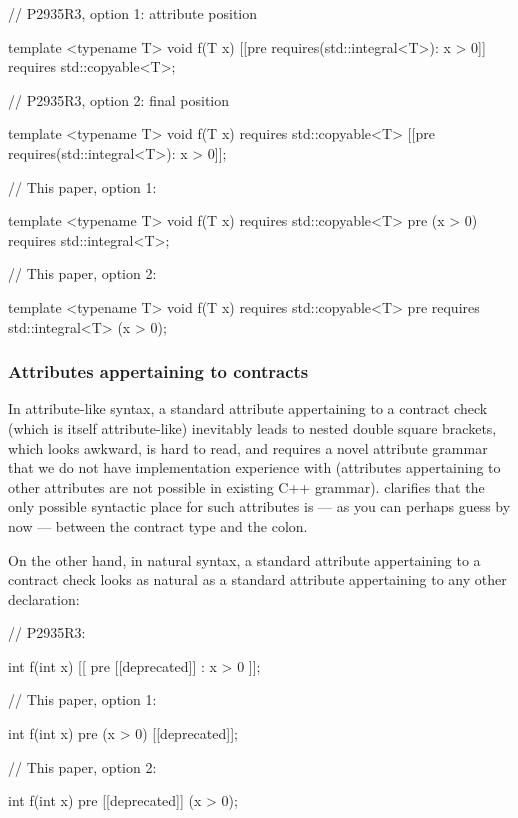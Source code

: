 \begin{minipage}[t]{8.7cm}
\begin{codeblock}
// P2935R3, option 1: attribute position

template <typename T>
void f(T x)
  [[pre requires(std::integral<T>): x > 0]]
  requires std::copyable<T>;
    
// P2935R3, option 2: final position

template <typename T>
void f(T x)
  requires std::copyable<T>
  [[pre requires(std::integral<T>): x > 0]];
\end{codeblock}
\end{minipage}
\begin{minipage}[t]{8cm}
\begin{codeblock}
// This paper, option 1:

template <typename T>
void f(T x)
  requires std::copyable<T>
  pre (x > 0) requires std::integral<T>;
    
// This paper, option 2:

template <typename T>
void f(T x)
  requires std::copyable<T>
  pre requires std::integral<T> (x > 0);
\end{codeblock}
\end{minipage}

\subsubsection{Attributes appertaining to contracts}

In attribute-like syntax, a standard attribute appertaining to a contract check (which is itself attribute-like) inevitably leads to nested double square brackets, which looks awkward, is hard to read, and requires a novel attribute grammar that we do not have implementation experience with (attributes appertaining to other attributes are not possible in existing C++ grammar).  \cite{P2935R3} clarifies that the only possible syntactic place for such attributes is --- as you can perhaps guess by now --- between the contract type and the colon.

On the other hand, in natural syntax, a standard attribute appertaining to a contract check looks as natural as a standard attribute appertaining to any other declaration:

\begin{minipage}[t]{8cm}
\begin{codeblock}
// P2935R3:

int f(int x) 
  [[ pre [[deprecated]] : x > 0 ]];
\end{codeblock}
\end{minipage}
\begin{minipage}[t]{8cm}
\begin{codeblock}
// This paper, option 1:

int f(int x) 
  pre (x > 0) [[deprecated]];
  
// This paper, option 2:

int f(int x) 
  pre [[deprecated]] (x > 0);
\end{codeblock}
\end{minipage}

